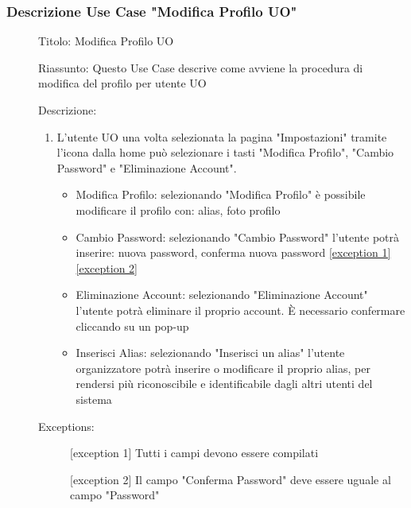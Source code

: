 \documentclass{article}
\begin{document}
\subsubsection*{Descrizione Use Case "Modifica Profilo UO"}
\begin{description}
    \item[] Titolo: Modifica Profilo UO
    \item[] Riassunto: Questo Use Case descrive come avviene la procedura di modifica del profilo per utente UO
    \item[] Descrizione:
        \begin{enumerate}
            \item L'utente UO una volta selezionata la pagina "Impostazioni" tramite l'icona  dalla home può selezionare i tasti "Modifica Profilo", "Cambio Password" e "Eliminazione Account".
                  \begin{itemize}
                      \item Modifica Profilo: selezionando "Modifica Profilo" è possibile modificare il profilo con: alias, foto profilo
                      \item Cambio Password: selezionando "Cambio Password" l'utente potrà inserire: nuova password, conferma nuova password \hyperref[exc:13.1]{[exception 1]}\hyperref[exc:13.2]{[exception 2]}
                      \item Eliminazione Account: selezionando "Eliminazione Account" l'utente potrà eliminare il proprio account. È necessario confermare cliccando su un pop-up
                      \item Inserisci Alias: selezionando "Inserisci un alias" l'utente organizzatore potrà inserire o modificare il proprio alias, per rendersi più riconoscibile e identificabile dagli altri utenti del sistema
                  \end{itemize}
        \end{enumerate}
    \item[] Exceptions:
        \begin{description}
            \item[] \label{exc:13.1} [exception 1] Tutti i campi devono essere compilati
            \item[] \label{exc:13.2} [exception 2] Il campo "Conferma Password" deve essere uguale al campo "Password"
        \end{description}
\end{description}
\clearpage
\end{document}
